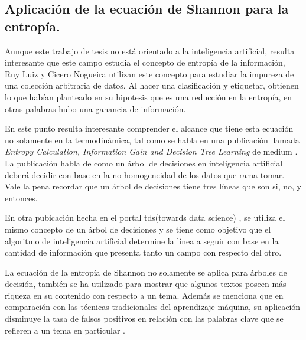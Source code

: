 \subsection{Aplicación de la ecuación de Shannon para la entropía.}

Aunque este trabajo de tesis no está orientado a la inteligencia artificial, resulta interesante que este campo estudia el concepto de entropía de la información, Ruy Luiz y Cicero Nogueira utilizan este concepto para estudiar la impureza de una colección arbitraria de datos. Al hacer una clasificación y etiquetar, obtienen lo que habían planteado en su hipotesis que es una reducción en la entropía, en otras palabras hubo una ganancia de información\citep[página 14][]{dos2012entropy}. 

En este punto resulta interesante comprender el alcance que tiene esta ecuación no solamente en la termodinámica, tal como se habla en una publicación llamada \textit{Entropy Calculation, Information Gain and Decision Tree Learning} de medium \citep[][]{medium}. La publicación habla de como un árbol de decisiones en inteligencia artificial deberá decidir con base en la no homogeneidad de los datos que rama tomar. Vale la pena recordar que un árbol de decisiones tiene tres líneas que son si, no, y entonces. 

En otra pubicación hecha en el portal tds(towards data science) \citep[][]{tds}, se utiliza el mismo concepto de un árbol de decisiones y se tiene como objetivo que el algoritmo de inteligencia artificial determine la línea a seguir con base en la cantidad de información que presenta tanto un campo con respecto del otro. 

La ecuación de la entropía de Shannon no solamente se aplica para árboles de decisión, también se ha utilizado para mostrar que algunos textos poseen más riqueza en su contenido con respecto a un tema. Además se menciona que en comparación con las técnicas tradicionales del aprendizaje-máquina, su aplicación disminuye la tasa de falsos positivos en relación con las palabras clave que se refieren a un tema en particular \citep[][]{chan2022knowledge} .   
 

